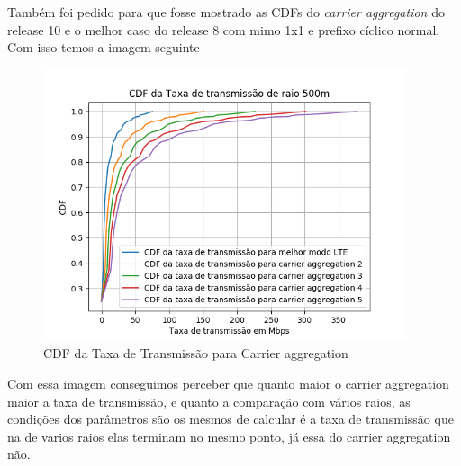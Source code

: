 \documentclass[12pt]{article}
\begin{document}
Também foi pedido para que fosse mostrado as CDFs do \textit{carrier aggregation} do release 10 e o melhor caso do release 8 com mimo 1x1 e prefixo cíclico normal. Com isso temos a imagem seguinte
\begin{figure}[h!]
\includegraphics[width=0.95\textwidth]{CDF_Carrier.png}
    \caption{CDF da Taxa de Transmissão para Carrier aggregation}
    \label{fig:my_label}
\end{figure}
\FloatBarrier
Com essa imagem conseguimos perceber que quanto maior o carrier aggregation maior a taxa de transmissão, e quanto a comparação com vários raios, as condições dos parâmetros são os mesmos de calcular é a taxa de transmissão que na de varios raios elas terminam no mesmo ponto, já essa do carrier aggregation não.


\end{document}
